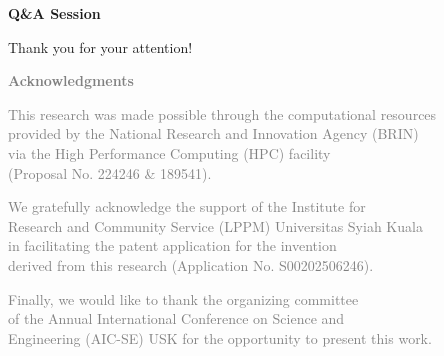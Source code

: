 \documentclass{beamer}
\begin{document}
\begin{frame}{}
  \vfill
  \begin{center}
    {\Huge \textcolor{uskGold}{\textbf{Q\&A Session}}}
    
    \vspace{2em}
    
    {\large Thank you for your attention!}
  \end{center}
  \vfill
  
  \begin{center}
    {\footnotesize \textcolor{gray}{\textbf{Acknowledgments}}}
    
    \vspace{0.5em}
    
    {\scriptsize \textcolor{gray}{
    This research was made possible through the computational resources\\
    provided by the National Research and Innovation Agency (BRIN)\\
    via the High Performance Computing (HPC) facility\\
    (Proposal No. 224246 \& 189541).
    }}
    
    \vspace{0.3em}
    
    {\scriptsize \textcolor{gray}{
    We gratefully acknowledge the support of the Institute for\\
    Research and Community Service (LPPM) Universitas Syiah Kuala\\
    in facilitating the patent application for the invention\\
    derived from this research (Application No. S00202506246).
    }}
    
    \vspace{0.3em}
    
    {\scriptsize \textcolor{gray}{
    Finally, we would like to thank the organizing committee\\
    of the Annual International Conference on Science and\\
    Engineering (AIC-SE) USK for the opportunity to present this work.
    }}
  \end{center}
\end{frame}
\end{document}
